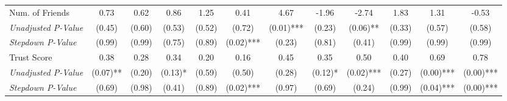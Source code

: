 \begin{tabular}{l c c c c c c c c c c c}
Num. of Friends & 0.73 & 0.62 & 0.86 & 1.25 & 0.41 & 4.67 & -1.96 & -2.74 & 1.83 & 1.31 & -0.53 \\
\quad \textit{Unadjusted P-Value} & (0.45) & (0.60) & (0.53) & (0.52) & (0.72) & (0.01)*** & (0.23) & (0.06)** & (0.33) & (0.57) & (0.58) \\
\quad \textit{Stepdown P-Value} & (0.99) & (0.99) & (0.75) & (0.89) & (0.02)*** & (0.23) & (0.81) & (0.41) & (0.99) & (0.99) & (0.99) \\
Trust Score & 0.38 & 0.28 & 0.34 & 0.20 & 0.16 & 0.45 & 0.35 & 0.50 & 0.40 & 0.69 & 0.78 \\
\quad \textit{Unadjusted P-Value} & (0.07)** & (0.20) & (0.13)* & (0.59) & (0.50) & (0.28) & (0.12)* & (0.02)*** & (0.27) & (0.00)*** & (0.00)*** \\
\quad \textit{Stepdown P-Value} & (0.69) & (0.98) & (0.41) & (0.89) & (0.02)*** & (0.97) & (0.69) & (0.24) & (0.99) & (0.04)*** & (0.00)*** \\
\bottomrule
\end{tabular}
